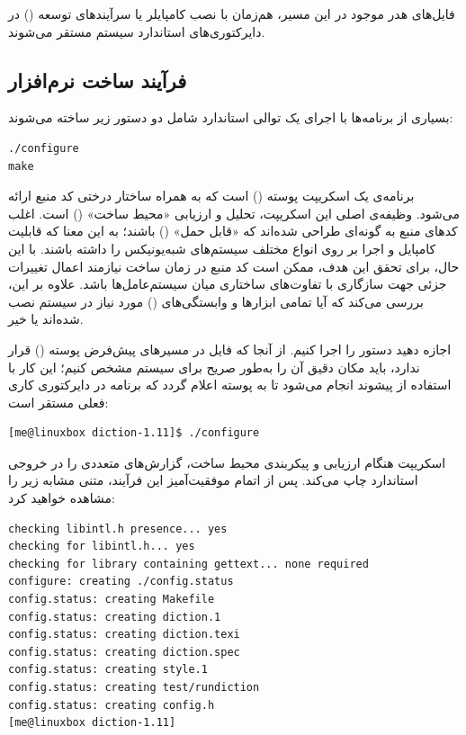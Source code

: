 فایل‌های هدر موجود در این مسیر، هم‌زمان با نصب کامپایلر یا سرآیندهای توسعه () در دایرکتوری‌های استاندارد سیستم مستقر می‌شوند.

\subsection{فرآیند ساخت نرم‌افزار}

بسیاری از برنامه‌ها با اجرای یک توالی استاندارد شامل دو دستور زیر ساخته می‌شوند:

\begin{latin}
\begin{lstlisting}
./configure
make
\end{lstlisting}
\end{latin}

برنامه‌ی  یک اسکریپت پوسته () است که به همراه ساختار درختی کد منبع ارائه می‌شود. وظیفه‌ی اصلی این اسکریپت، تحلیل و ارزیابی «محیط ساخت» () است. اغلب کدهای منبع به گونه‌ای طراحی شده‌اند که «قابل حمل» () باشند؛ به این معنا که قابلیت کامپایل و اجرا بر روی انواع مختلف سیستم‌های شبه‌یونیکس را داشته باشند. با این حال، برای تحقق این هدف، ممکن است کد منبع در زمان ساخت نیازمند اعمال تغییرات جزئی جهت سازگاری با تفاوت‌های ساختاری میان سیستم‌عامل‌ها باشد. علاوه بر این،  بررسی می‌کند که آیا تمامی ابزارها و وابستگی‌های () مورد نیاز در سیستم نصب شده‌اند یا خیر.

اجازه دهید دستور  را اجرا کنیم. از آنجا که فایل  در مسیرهای پیش‌فرض پوسته () قرار ندارد، باید مکان دقیق آن را به‌طور صریح برای سیستم مشخص کنیم؛ این کار با استفاده از پیشوند  انجام می‌شود تا به پوسته اعلام گردد که برنامه در دایرکتوری کاری فعلی مستقر است:

\begin{latin}
\begin{lstlisting}
[me@linuxbox diction-1.11]$ ./configure
\end{lstlisting}
\end{latin}

اسکریپت  هنگام ارزیابی و پیکربندی محیط ساخت، گزارش‌های متعددی را در خروجی استاندارد چاپ می‌کند. پس از اتمام موفقیت‌آمیز این فرآیند، متنی مشابه زیر را مشاهده خواهید کرد:

\begin{latin}
\begin{lstlisting}
checking libintl.h presence... yes
checking for libintl.h... yes
checking for library containing gettext... none required
configure: creating ./config.status
config.status: creating Makefile
config.status: creating diction.1
config.status: creating diction.texi
config.status: creating diction.spec
config.status: creating style.1
config.status: creating test/rundiction
config.status: creating config.h
[me@linuxbox diction-1.11]
\end{lstlisting}
\end{latin}

